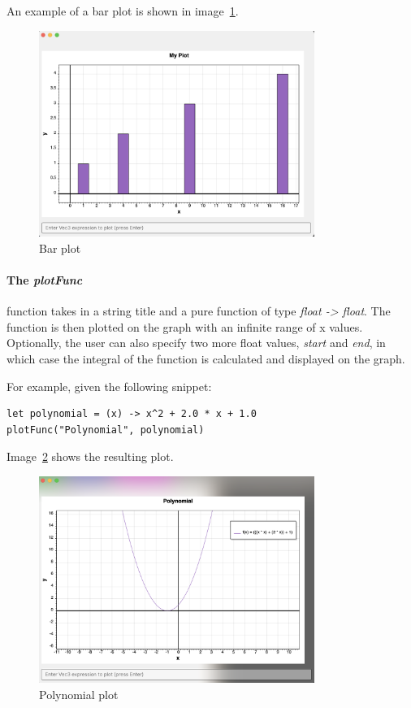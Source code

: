 An example of a bar plot is shown in image~\ref{fig:bar-plot}.

\begin{figure}[H]
    \centering
    \includegraphics[width=0.8\textwidth]{assets/barChart}
    \caption{Bar plot}\label{fig:bar-plot}
\end{figure}

\paragraph{The \textit{plotFunc}} function takes in a string title and a pure function of type \textit{float -> float}.
The function is then plotted on the graph with an infinite range of x values.
Optionally, the user can also specify two more float values, \textit{start} and \textit{end}, in which case the 
integral of the function is calculated and displayed on the graph.

For example, given the following snippet:

\begin{verbatim}
let polynomial = (x) -> x^2 + 2.0 * x + 1.0
plotFunc("Polynomial", polynomial)
\end{verbatim}

Image~\ref{fig:polynomial-plot} shows the resulting plot.

\begin{figure}[H]
    \centering
    \includegraphics[width=0.8\textwidth]{assets/polynomialPlot}
    \caption{Polynomial plot}\label{fig:polynomial-plot}
\end{figure}

